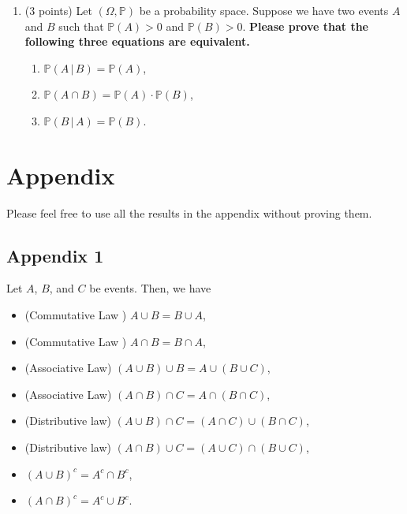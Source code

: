 \documentclass[11pt]{article}
\newcommand{\p}{\mathbb{P}}
\begin{document}
\begin{enumerate}
\begin{proof}
  \begin{align*}
    \p(\text{``snow tomorrow"}\,|\,\text{``snow today"}) &= \frac{\p(\text{``snow tomorrow"}\cap \text{``snow today"})}{\p(\text{``snow today"})}\\
    &= 0.25/3\\
    &= 5/6
  \end{align*}
\end{proof}

\item (3 points) Let $(\Omega,\mathbb{P})$ be a probability space. Suppose we have two events $A$ and $B$ such that $\mathbb{P}(A)>0$ and $\mathbb{P}(B)>0$. \textbf{Please prove that the following three equations are equivalent.}
    \begin{enumerate}
        \item $\mathbb{P}(A\,\vert\,B)=\mathbb{P}(A)$,
        \item $\mathbb{P}(A\cap B)=\mathbb{P}(A)\cdot \mathbb{P}(B)$,
        \item $\mathbb{P}(B\,\vert\,A)=\mathbb{P}(B)$.
    \end{enumerate}

\end{enumerate}


\newpage

\section{Appendix}

Please feel free to use all the results in the appendix without proving them.

\subsection{Appendix 1}

Let $A$, $B$, and $C$ be events. Then, we have
\begin{itemize}
\item (Commutative Law ) $A\cup B=B\cup A$,
\item (Commutative Law ) $A\cap B= B\cap A$,
\item (Associative Law) $(A\cup B)\cup B=A\cup (B\cup C)$,
\item (Associative Law) $(A\cap B)\cap C= A\cap(B\cap C)$,
\item (Distributive law) $(A\cup B)\cap C=(A\cap C)\cup (B\cap C)$,
\item (Distributive law) $(A\cap B)\cup C=(A\cup C)\cap (B\cup C)$,
\item $ (A\cup B)^c=A^c\cap B^c$,
\item $ (A\cap B)^c=A^c\cup B^c$.
\end{itemize}
\end{document}
